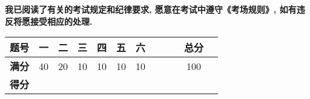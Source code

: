 \documentclass[zihao=5,noanswers]{BHCexam}
\begin{document}
 {\small \kaishu \textbf{我已阅读了有关的考试规定和纪律要求, 愿意在考试中遵守《考场规则》, 如有违反将愿接受相应的处理.}}
\begin{center}
   \setlength{\tabcolsep}{3mm}
   \begin{tabular}{*{12}{|c}|}
      \hline \textbf{题号} & 一 & 二 & 三 & 四 & 五 & 六 &   &   & &  总分 \\
      \hline \textbf{满分}& 40 & 20 & 10 & 10 & 10 & 10  &  &  &  & 100\\
      \hline \textbf{得分}&&&&&&&&&& \\
      \hline
   \end{tabular}
\end{center}

\vspace{0.5cm}
\end{document}

